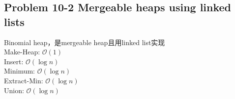 \subsection*{Problem 10-2 Mergeable heaps using linked lists}
\noindent Binomial heap，是mergeable heap且用linked list实现 \\
Make-Heap: $\mathcal{O}(1)$ \\
Insert: $\mathcal{O}(\log{n})$ \\
Minimum: $\mathcal{O}(\log{n})$ \\
Extract-Min: $\mathcal{O}(\log{n})$ \\
Union: $\mathcal{O}(\log{n})$

